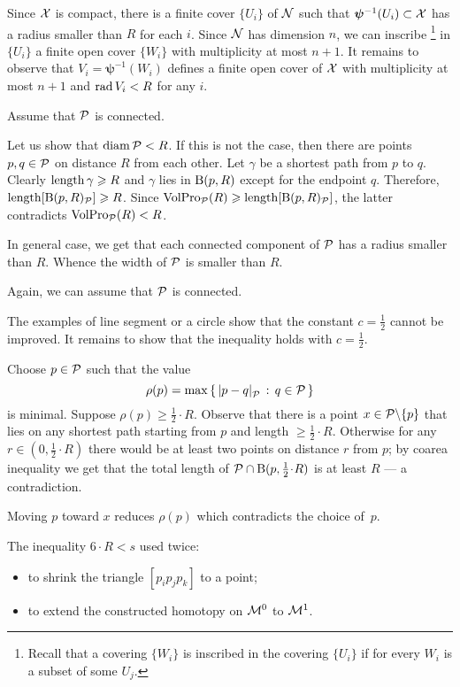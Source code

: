 Since $\mathcal{X}$ is compact,  there is a finite cover $\{U_i\}$ of $\mathcal{N}$ such that $\bm{\psi}^{-1}(U_i)\subset\mathcal{X}$ has a radius smaller than $R$ for each $i$.
Since $\mathcal{N}$ has dimension $n$, we can inscribe%
\footnote{Recall that a covering $\{W_i\}$ is inscribed in the covering $\{U_i\}$ if for every $W_i$ is a subset of some $U_j$.} 
in $\{U_i\}$ a finite open cover $\{W_i\}$ with multiplicity at most $n+1$.
It remains to observe that $V_i=\bm{\psi}^{-1}(W_i)$ defines a finite open cover of $\mathcal{X}$ with  multiplicity at most $n+1$ and $\mathop{\rm rad}\nolimits V_i<R$ for any $i$. 

Assume that $\mathcal{P}$ is connected.

Let us show that $\operatorname{\rm diam}\nolimits\mathcal{P}<R$.
If this is not the case, then there are points $p,q\in\mathcal{P}$ on distance $R$ from each other.
Let $\gamma$ be a shortest path from $p$ to $q$.
Clearly $\mathop{\rm length}\nolimits\gamma\geqslant R$ and $\gamma$ lies in $\mathrm{B}{}(p,R)$ except for the endpoint $q$.
Therefore, $\mathop{\rm length}\nolimits[\mathrm{B}{}(p,R)_{\mathcal{P}}]\geqslant R$.
Since $\VolPro_{\spc{P}}(R)\z\ge \length[\oBall(p,R)_{\spc{P}}]$,
the latter contradicts $\operatorname{\rm VolPro}\nolimits_{\mathcal{P}}(R)<R$.

In general case, we get that each connected component of $\mathcal{P}$ has a radius smaller than $R$.
Whence the width of $\mathcal{P}$ is smaller than $R$.

 Again, we can assume that $\mathcal{P}$ is connected.

The examples of line segment or a circle show that the constant $c=\tfrac12$ cannot be improved.
It remains to show that the inequality holds with $c=\tfrac12$.

Choose $p\in\mathcal{P}$ such that the value
\[\rho(p)=\max\set{\dist{p}{q}{\spc{P}}}{q\in\spc{P}}\]
is minimal.
Suppose $\rho(p)\ge\tfrac 12\cdot R$.
Observe that there is a point $x\z\in \spc{P}\backslash\{p\}$ that lies on any shortest path starting from $p$ and length $\ge\tfrac 12\cdot R$.
Otherwise for any $r\in(0,\tfrac 12\cdot R)$ there would be at least two points on distance $r$ from $p$;
by coarea inequality we get that the total length of $\spc{P}\cap \oBall(p,\tfrac 12\cdot R)$ is at least $R$ --- a contradiction.

Moving $p$ toward $x$ reduces $\rho(p)$ which contradicts the choice of~$p$.

The inequality $6\cdot R<s$ used twice:
\begin{itemize}
\item to shrink the triangle $[p_ip_jp_k]$ to a point;
\item to extend the constructed homotopy on $\mathcal{M}^0$ to $\mathcal{M}^1$.
\end{itemize}

